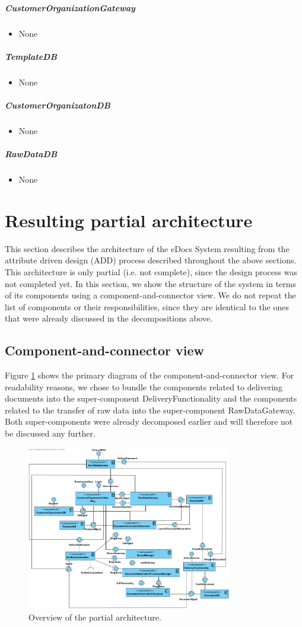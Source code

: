 \documentclass[a4paper,10pt]{article}
\begin{document}
\subparagraph{CustomerOrganizationGateway}
\begin{itemize}
	\item None
\end{itemize}

\subparagraph{TemplateDB}
\begin{itemize}
	\item None
\end{itemize}

\subparagraph{CustomerOrganizatonDB}
\begin{itemize}
	\item None
\end{itemize}

\subparagraph{RawDataDB}
\begin{itemize}
	\item None
\end{itemize}

\section{Resulting partial architecture}\label{sec:architecture}
This section describes the architecture of the eDocs System resulting from the attribute driven design (ADD\@) process described throughout the above sections. This architecture is only partial (i.e. not complete), since the design process was not completed yet.
In this section, we show the structure of the system in terms of its components using a component-and-connector view. We do not repeat the list of components or their responsibilities, since they are identical to the ones that were already discussed in the decompositions above.

\subsection{Component-and-connector view}
Figure \ref{fig:partArch} shows the primary diagram of the component-and-connector view. For readability reasons, we chose to bundle the components related to delivering documents into the super-component DeliveryFunctionality and the components related to the transfer of raw data into the super-component RawDataGateway. Both super-components were already decomposed earlier and will therefore not be discussed any further.

\begin{figure}[!htp]
	\centering
	\includegraphics[width=0.8\textwidth]{PartialArchitecture1.png}
	\caption{Overview of the partial architecture.
	}\label{fig:partArch}
\end{figure}





\end{document}
